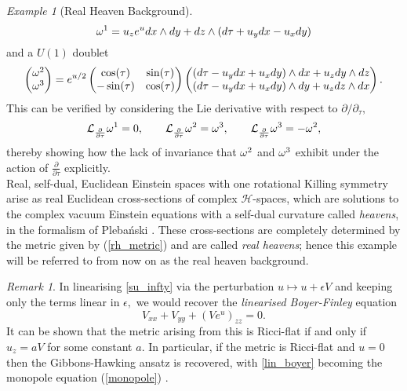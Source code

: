 \documentclass[a4paper,12pt, onecolumn, notitlepage]{article}
\theoremstyle{definition}
\theoremstyle{remark}
\newtheorem{rmk}[thm]{Remark}
\newtheorem{ex}[thm]{Example}
\newcommand{\w}{\omega}
\newcommand{\e}{\epsilon}
\newcommand{\ddt}[1]{\frac{\partial #1}{\partial \tau}}
\begin{document}
\begin{ex}[Real Heaven Background]
	\begin{equation}
	\label{su_k1}
		\w\indices{^1} = u_{z}e^{u}dx\wedge dy + dz \wedge (d\tau + u_{y}dx - u_{x}dy)
	\end{equation}
	and a $U(1)$ doublet \cite{bakas_1995}
	\begin{equation*}
	\label{su_k23}
		\begin{pmatrix}
		\w\indices{^2}\\
		\w\indices{^3}
		\end{pmatrix}
		=
		e^{u/2}
		\begin{pmatrix}
		\cos(\tau) & \sin(\tau) \\
		-\sin(\tau) & \cos(\tau)
		\end{pmatrix}
		\begin{pmatrix}
		(d\tau - u_{y}dx+u_{x}dy)\wedge dx + u_{z}dy\wedge dz\\
		(d\tau - u_{y}dx+u_{x}dy) \wedge dy + u_{z}dz\wedge dx
		\end{pmatrix}.
	\end{equation*}
	This can be verified by considering the Lie derivative with respect to $\partial/\partial_{\tau},$
	\begin{equation*}
		\mathcal{L}_{\ddt{}}\w\indices{^1}=0,\qquad \mathcal{L}_{\ddt{}}\w\indices{^2}=\w\indices{^3},\qquad
		\mathcal{L}_{\ddt{}}\w\indices{^3}= -\w\indices{^2},
	\end{equation*}
	thereby showing how the lack of invariance that $\w\indices{^2}$ and $\w\indices{^3}$ exhibit under the action of $\ddt{}$ explicitly.\\
	Real, self-dual, Euclidean Einstein spaces with one rotational Killing symmetry arise as real Euclidean cross-sections of complex $\mathcal{H}$-spaces, which are solutions to the complex vacuum Einstein equations with a self-dual curvature called \emph{heavens}, in the formalism of Pleba\'nski \cite{plebanski_1975,park_1990}. These cross-sections are completely determined by the metric given by (\ref{rh_metric}) and are called \emph{real heavens}; hence this example will be referred to from now on as the real heaven background.\\
\end{ex}

\begin{rmk}
	In linearising \cref{su_infty} via the perturbation $u\mapsto u + \e V$ and keeping only the terms linear in $\e,$ we would recover the \emph{linearised Boyer-Finley} equation
	\begin{equation}
		\label{lin_boyer}
		V_{xx} + V_{yy} + (Ve^{u})_{zz}=0. 
	\end{equation}
	It can be shown that the metric arising from this is Ricci-flat if and only if $u_{z} = aV$ for some constant $a.$ In particular, if the metric is Ricci-flat and $u=0$ then the Gibbons-Hawking ansatz is recovered, with \cref{lin_boyer} becoming the monopole equation (\ref{monopole}) \cite{lebrun_1991}.
\end{rmk}
\end{document}
